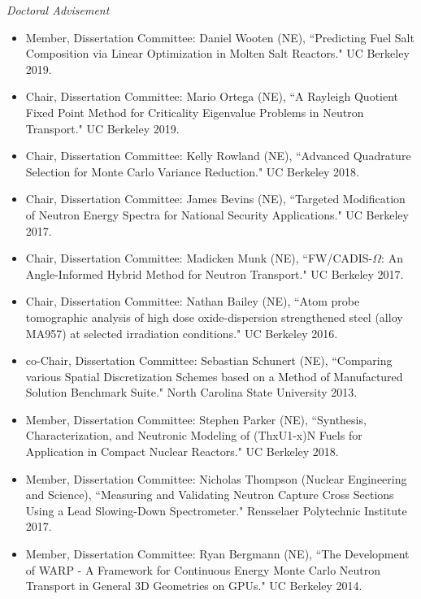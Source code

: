 \textit{Doctoral Advisement}
\begin{itemize}
\item Member, Dissertation Committee: Daniel Wooten (NE), ``Predicting Fuel Salt Composition via Linear Optimization in Molten Salt
Reactors."  UC Berkeley 2019.
%
\item Chair, Dissertation Committee: Mario Ortega (NE), ``A Rayleigh Quotient Fixed Point Method for Criticality Eigenvalue Problems in Neutron Transport."  UC Berkeley 2019.
%
\item Chair, Dissertation Committee: Kelly Rowland (NE), ``Advanced Quadrature Selection for Monte Carlo Variance Reduction."  UC Berkeley 2018.
%
\item Chair, Dissertation Committee: James Bevins (NE), ``Targeted Modification of Neutron Energy Spectra for National Security Applications."  UC Berkeley 2017.
%
\item Chair, Dissertation Committee: Madicken Munk (NE), ``FW/CADIS-$\Omega$: An Angle-Informed Hybrid Method for Neutron Transport."  UC Berkeley 2017.
%
\item Chair, Dissertation Committee: Nathan Bailey (NE), ``Atom probe tomographic analysis of high dose oxide-dispersion strengthened steel (alloy MA957) at selected irradiation conditions."  UC Berkeley 2016.
%
\item co-Chair, Dissertation Committee: Sebastian Schunert (NE), ``Comparing various Spatial Discretization Schemes based on a Method of Manufactured Solution Benchmark Suite." North Carolina State University 2013.
%
\item Member, Dissertation Committee: Stephen Parker (NE), ``Synthesis, Characterization, and Neutronic Modeling of (ThxU1-x)N Fuels for Application in Compact Nuclear Reactors."  UC Berkeley 2018.
%
\item Member, Dissertation Committee: Nicholas Thompson (Nuclear Engineering and Science), ``Measuring and Validating Neutron Capture Cross Sections Using a Lead Slowing-Down Spectrometer."  Rensselaer Polytechnic Institute 2017.
%
\item Member, Dissertation Committee: Ryan Bergmann (NE), ``The Development of WARP - A Framework for Continuous Energy Monte Carlo Neutron Transport in General 3D Geometries on GPUs."  UC Berkeley 2014.
\end{itemize}

